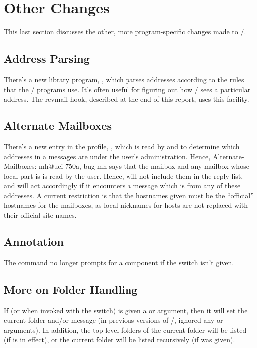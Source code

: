 \section{Other Changes}
This last section discusses the other,
more program-specific changes made to \MH/.
\subsection{Address Parsing}
There's a new library program, , which parses addresses according to
the rules that the \MH/ programs use.
It's often useful for figuring out how \MH/ sees a particular address.
The  rcvmail hook,
described at the end of this report,
uses this facility.
\subsection{Alternate Mailboxes}
There's a new entry in the profile, ,
which is read by  and  to determine which addresses in a
messages are under the user's administration.
Hence,
\example
    Alternate-Mailboxes: mh@uci-750a, bug-mh
\endexample
says that the mailbox 
and any mailbox whose local part is 
is read by the user.
Hence,  will not include them in the reply list,
and  will act accordingly if it encounters a message which is from
any of these addresses.
A current restriction is that the hostnames given must be the ``official''
hostnames for the mailboxes,
as local nicknames for hosts are not replaced with their official site names.
\subsection{Annotation}
The  command no longer prompts for a  component
if the  switch isn't given.
\subsection{More on Folder Handling}
If  
(or  when invoked with the  switch)
is given a  or  argument,
then it will set the current folder and/or message
(in previous versions of \MH/,
 ignored any  or  arguments).
In addition,
the top-level folders of the current folder will be listed
(if  is in effect),
or the current folder will be listed recursively
(if  was given).
